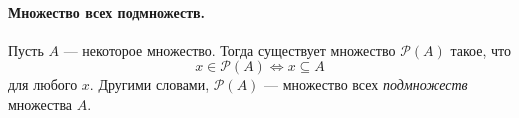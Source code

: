 \documentclass[12pt,notitlepage]{article}
\theoremstyle{plain}
\theoremstyle{definition}
\theoremstyle{plain}
\newcommand{\N}{\mathbb{N}}
\newcommand{\Z}{\mathbb{Z}}
\newcommand{\sbs}{\subseteq}
\newcommand{\void}{\varnothing}
\newcommand{\mP}{\mathcal{P}}
\renewcommand{\phi}{\varphi}
\newcommand{\1}{\mathbf{1}}
\newcommand{\0}{\mathbf{0}}
\begin{document}
%
%
%
%
%

\paragraph{Множество всех подмножеств.} Пусть $A$ --- некоторое множество. Тогда существует множество $\mP(A)$ такое, что
$$x \in \mP(A) \iff x \sbs A$$
для любого $x$. Другими словами, $\mP(A)$ --- множество всех \emph{подмножеств} множества $A$.
\end{document}
